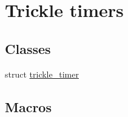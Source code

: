 \hypertarget{group__trickle-timer}{}\section{Trickle timers}
\label{group__trickle-timer}
\subsection*{Classes}
\begin{DoxyCompactItemize}
\item 
struct \hyperlink{structtrickle__timer}{trickle\+\_\+timer}
\end{DoxyCompactItemize}
\subsection*{Macros}
